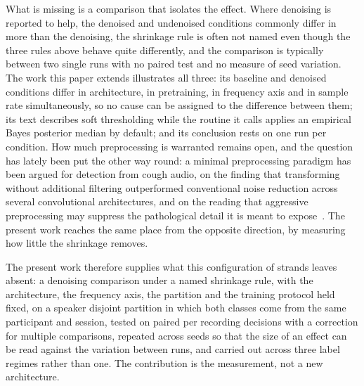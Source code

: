 What is missing is a comparison that isolates the effect. Where denoising is reported to
help, the denoised and undenoised conditions commonly differ in more than the denoising,
the shrinkage rule is often not named even though the three rules above behave quite
differently, and the comparison is typically between two single runs with no paired test
and no measure of seed variation. The work this paper extends illustrates all three: its
baseline and denoised conditions differ in architecture, in pretraining, in frequency axis
and in sample rate simultaneously, so no cause can be assigned to the difference between
them; its text describes soft thresholding while the routine it calls applies an empirical
Bayes posterior median by default; and its conclusion rests on one run per condition. How much preprocessing is warranted remains open, and the
question has lately been put the other way round: a minimal preprocessing
paradigm has been argued for detection from cough audio, on the finding that
transforming without additional filtering outperformed conventional noise
reduction across several convolutional architectures, and on the reading that
aggressive preprocessing may suppress the pathological detail it is meant to
expose~\cite{lim2026}. The present work reaches the same place from the
opposite direction, by measuring how little the shrinkage removes.

The present work therefore supplies what this configuration of strands leaves absent: a
denoising comparison under a named shrinkage rule, with the architecture, the frequency
axis, the partition and the training protocol held fixed, on a speaker disjoint partition
in which both classes come from the same participant and session, tested on paired per
recording decisions with a correction for multiple comparisons, repeated across seeds so
that the size of an effect can be read against the variation between runs, and carried
out across three label regimes rather than one. The contribution is the measurement, not
a new architecture.

